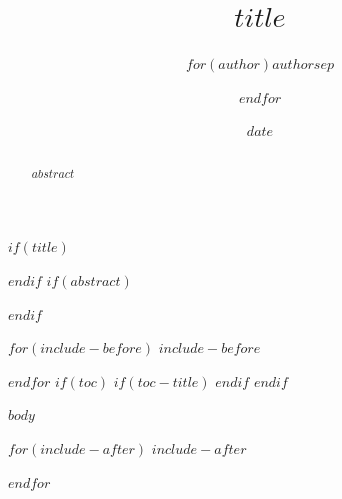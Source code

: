 \documentclass[UTF8,zihao=-4$for(classoption)$,$classoption$$endfor$]{ctexart}
\title{$title$}
\author{$for(author)$$author$$sep$ \and $endfor$}
\author{}
\date{$date$}
\date{}
\begin{document}
$if(title)$
\maketitle
$endif$
$if(abstract)$
\begin{abstract}
$abstract$
\end{abstract}
$endif$

$for(include-before)$
$include-before$

$endfor$
$if(toc)$
$if(toc-title)$
\renewcommand*\contentsname{$toc-title$}
$endif$
{
\setcounter{tocdepth}{$toc-depth$}
\tableofcontents
}
$endif$

$body$

$for(include-after)$
$include-after$

$endfor$
\end{document}
